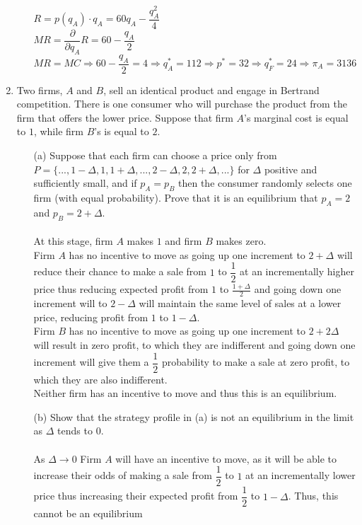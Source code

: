 \documentclass[11pt]{article}
\begin{document}
\begin{enumerate}
\begin{itemize}
	$R=p(q_A)\cdot q_A=60q_A-\dfrac{q_A^2}{4}$\\
	$MR=\dfrac{\partial}{\partial q_A}R=60-\dfrac{q_A}{2}$\\
	$MR=MC\Rightarrow60-\dfrac{q_A}{2}=4\Rightarrow q_A^*=112\Rightarrow p^*=32\Rightarrow q_F^*=24\Rightarrow\pi_A=3136$
	\end{itemize}
\item Two firms, $A$ and $B$, sell an identical product and engage in Bertrand competition. There is one consumer who will purchase the product from the firm that offers the lower price. Suppose that firm $A$'s marginal cost is equal to $1$, while firm $B$'s is equal to $2$.
	\begin{itemize}
	\item[(a)] Suppose that each firm can choose a price only from $P=\{...,1-\Delta,1,1+\Delta,...,2-\Delta,2,2+\Delta,...\}$ for $\Delta$ positive and sufficiently small, and if $p_{A}=p_{B}$ then the consumer randomly selects one firm (with equal probability). Prove that it is an equilibrium that $p_{A}=2$ and $p_{B}=2+\Delta$.\\\\
	At this stage, firm $A$ makes $1$ and firm $B$ makes zero.\\
    Firm $A$ has no incentive to move as going up one increment to $2+\Delta$ will reduce their chance to make a sale from $1$ to $\dfrac{1}{2}$ at an incrementally higher price thus reducing expected profit from $1$ to $\frac{1+\Delta}{2}$ and going down one increment will to $2-\Delta$ will maintain the same level of sales at a lower price, reducing profit from $1$ to $1-\Delta$.\\
    Firm $B$ has no incentive to move as going up one increment to $2+2\Delta$ will result in zero profit, to which they are indifferent and going down one increment will give them a $\dfrac{1}{2}$ probability to make a sale at zero profit, to which they are also indifferent.\\
    Neither firm has an incentive to move and thus this is an equilibrium.\\
	\item[(b)] Show that the strategy profile in (a) is not an equilibrium in the limit as $\Delta$ tends to $0$.\\\\
	As $\Delta\rightarrow0$ Firm $A$ will have an incentive to move, as it will be able to increase their odds of making a sale from $\dfrac{1}{2}$ to $1$ at an incrementally lower price thus increasing their expected profit from $\dfrac{1}{2}$ to $1-\Delta$.  Thus, this cannot be an equilibrium\\

\end{itemize}
\end{enumerate}
\end{document}
